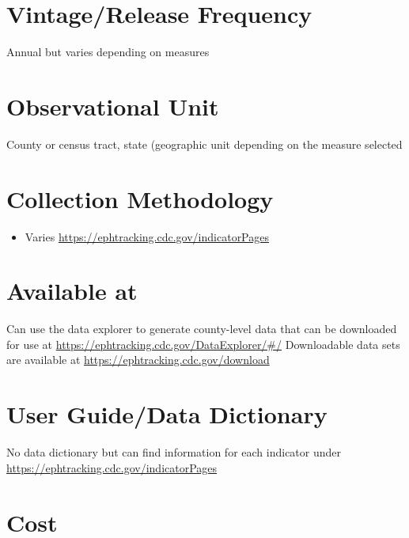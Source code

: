 \documentclass[
]{book}
\providecommand{\tightlist}{%
  \setlength{\itemsep}{0pt}\setlength{\parskip}{0pt}}
\begin{document}
\hypertarget{vintagerelease-frequency-48}{%
\section{Vintage/Release Frequency}\label{vintagerelease-frequency-48}}

Annual but varies depending on measures

\hypertarget{observational-unit-48}{%
\section{Observational Unit}\label{observational-unit-48}}

County or census tract, state (geographic unit depending on the measure selected

\hypertarget{collection-methodology-48}{%
\section{Collection Methodology}\label{collection-methodology-48}}

\begin{itemize}
\tightlist
\item
  Varies \url{https://ephtracking.cdc.gov/indicatorPages}
\end{itemize}

\hypertarget{available-at-48}{%
\section{Available at}\label{available-at-48}}

Can use the data explorer to generate county-level data that can be downloaded for use at \url{https://ephtracking.cdc.gov/DataExplorer/\#/} Downloadable data sets are available at \url{https://ephtracking.cdc.gov/download}

\hypertarget{user-guidedata-dictionary-48}{%
\section{User Guide/Data Dictionary}\label{user-guidedata-dictionary-48}}

No data dictionary but can find information for each indicator under \url{https://ephtracking.cdc.gov/indicatorPages}

\hypertarget{cost-48}{%
\section{Cost}\label{cost-48}}
\end{document}
